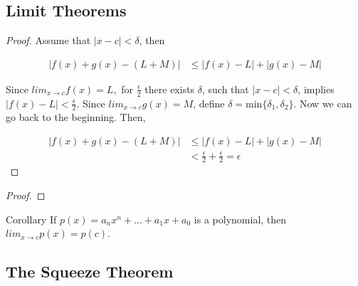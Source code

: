     \subsection{Limit Theorems}


        \begin{proof}
            Assume that $|x-c| < \delta$, then

            \begin{align*}
                |f(x) + g(x) - (L+M)| &\leq |f(x) - L| + |g(x) - M|
            \end{align*}

            Since $lim_{x\to c} f(x)=L,$ for $\frac{\epsilon}{2}$ there exists $\delta$, such that $|x-c|< \delta$, implies $|f(x)-L|<\frac{\epsilon}{2}$. Since $lim_{x\to c} g(x)=M$, define
            $\delta=\text{min}\{\delta_1,\delta_2\}$. Now we can go back to the beginning. Then,

            \begin{align*}
                |f(x)+g(x)-(L+M)|   &\leq |f(x)-L| + |g(x)-M| \\
                                    &<    \frac{\epsilon}{2} + \frac{\epsilon}{2} = \epsilon
            \end{align*}
        \end{proof}


        \begin{proof}

        \end{proof}

        \begin{tbhtheorem}{Corollary}
            If $p(x)=a_n x^n + \dots + a_1 x + a_0$ is a polynomial, then $lim_{x\to c} p(x) = p(c)$.
        \end{tbhtheorem}


    \subsection{The Squeeze Theorem}

